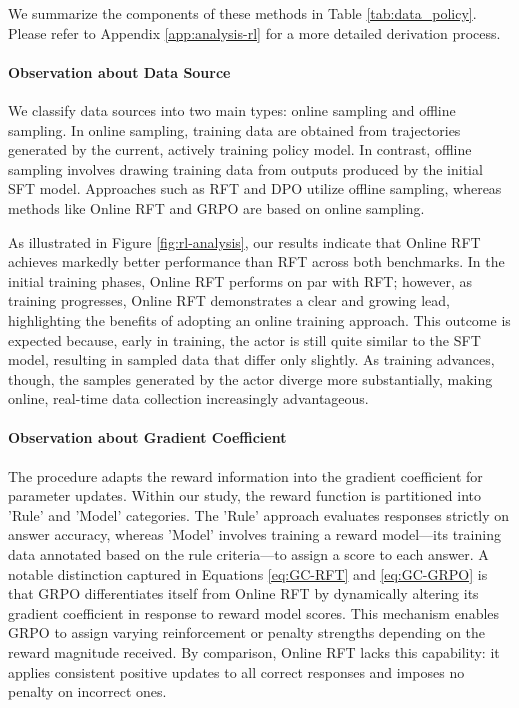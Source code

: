 \begin{itemize}[topsep=0pt]
We summarize the components of these methods in Table \ref{tab:data_policy}.
Please refer to Appendix \ref{app:analysis-rl} for a more detailed derivation process.

\paragraph{Observation about Data Source} We classify data sources into two main types: online sampling and offline sampling. In online sampling, training data are obtained from trajectories generated by the current, actively training policy model. In contrast, offline sampling involves drawing training data from outputs produced by the initial SFT model. Approaches such as RFT and DPO utilize offline sampling, whereas methods like Online RFT and GRPO are based on online sampling.

As illustrated in Figure \ref{fig:rl-analysis}, our results indicate that Online RFT achieves markedly better performance than RFT across both benchmarks. In the initial training phases, Online RFT performs on par with RFT; however, as training progresses, Online RFT demonstrates a clear and growing lead, highlighting the benefits of adopting an online training approach. This outcome is expected because, early in training, the actor is still quite similar to the SFT model, resulting in sampled data that differ only slightly. As training advances, though, the samples generated by the actor diverge more substantially, making online, real-time data collection increasingly advantageous.

\paragraph{Observation about Gradient Coefficient} The procedure adapts the reward information into the gradient coefficient for parameter updates. Within our study, the reward function is partitioned into 'Rule' and 'Model' categories. The 'Rule' approach evaluates responses strictly on answer accuracy, whereas 'Model' involves training a reward model—its training data annotated based on the rule criteria—to assign a score to each answer. A notable distinction captured in Equations \ref{eq:GC-RFT} and \ref{eq:GC-GRPO} is that GRPO differentiates itself from Online RFT by dynamically altering its gradient coefficient in response to reward model scores. This mechanism enables GRPO to assign varying reinforcement or penalty strengths depending on the reward magnitude received. By comparison, Online RFT lacks this capability: it applies consistent positive updates to all correct responses and imposes no penalty on incorrect ones.


\end{itemize}
